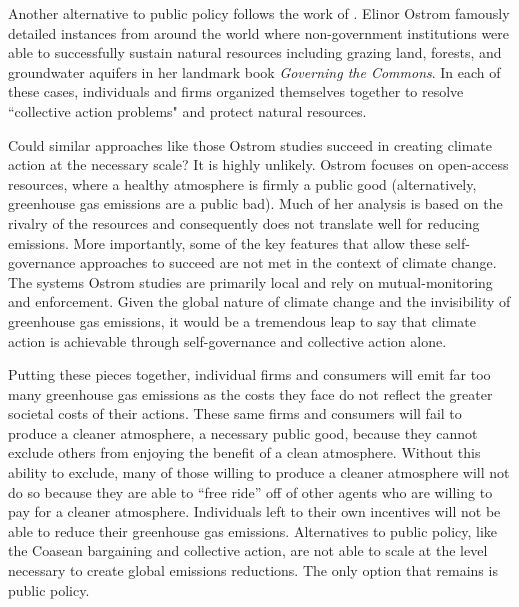 Another alternative to public policy follows the work of \cite{ostrom1990governing}. Elinor Ostrom famously detailed instances from around the world where non-government institutions were able to successfully sustain natural resources including grazing land, forests, and groundwater aquifers in her landmark book \textit{Governing the Commons}. In each of these cases, individuals and firms organized themselves together to resolve ``collective action problems" and protect natural resources. 

Could similar approaches like those Ostrom studies succeed in creating climate action at the necessary scale? It is highly unlikely. Ostrom focuses on open-access resources, where a healthy atmosphere is firmly a public good (alternatively, greenhouse gas emissions are a public bad). Much of her analysis is based on the rivalry of the resources and consequently does not translate well for reducing emissions. More importantly, some of the key features that allow these self-governance approaches to succeed are not met in the context of climate change. The systems Ostrom studies are primarily local and rely on mutual-monitoring and enforcement. Given the global nature of climate change and the invisibility of greenhouse gas emissions, it would be a tremendous leap to say that climate action is achievable through self-governance and collective action alone. 

Putting these pieces together, individual firms and consumers will emit far too many greenhouse gas emissions as the costs they face do not reflect the greater societal costs of their actions. These same firms and consumers will fail to produce a cleaner atmosphere, a necessary public good, because they cannot exclude others from enjoying the benefit of a clean atmosphere. Without this ability to exclude, many of those willing to produce a cleaner atmosphere will not do so because they are able to ``free ride'' off of other agents who are willing to pay for a cleaner atmosphere. Individuals left to their own incentives will not be able to reduce their greenhouse gas emissions. Alternatives to public policy, like the Coasean bargaining and collective action, are not able to scale at the level necessary to create global emissions reductions. The only option that remains is public policy. 

